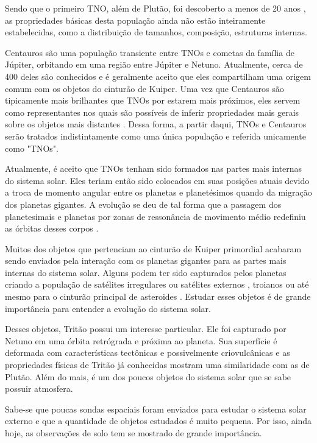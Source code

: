 \documentclass[12pt,a4paper]{monografia}
\begin{document}
Sendo que o primeiro TNO, além de Plutão, foi descoberto a menos de 20 anos \citep{Jewitt1993}, as propriedades básicas desta população ainda não estão inteiramente estabelecidas, como a distribuição de tamanhos, composição, estruturas internas.

Centauros são uma população transiente entre TNOs e cometas da família de Júpiter, orbitando em uma região entre Júpiter e Netuno. Atualmente, cerca de 400 deles são conhecidos e é geralmente aceito que eles compartilham uma origem comum com os objetos do cinturão de Kuiper. Uma vez que Centauros são tipicamente mais brilhantes que TNOs por estarem mais próximos, eles servem como representantes nos quais são possíveis de inferir propriedades mais gerais sobre os objetos mais distantes \citep{Fernandez2002}. Dessa forma, a partir daqui, TNOs e Centauros serão tratados indistintamente como uma única população e referida unicamente como "TNOs".

Atualmente, é aceito que TNOs tenham sido formados nas partes mais internas do sistema solar. Eles teriam então sido colocados em suas posições atuais devido a troca de momento angular entre os planetas e planetésimos quando da migração dos planetas gigantes. A evolução se deu de tal forma que a passagem dos planetesimais e planetas por zonas de ressonância de movimento médio redefiniu as órbitas desses corpos \citep{Tsiganis2005}.

Muitos dos objetos que pertenciam ao cinturão de Kuiper primordial acabaram sendo enviados pela interação com os planetas gigantes para as partes mais internas do sistema solar. Alguns podem ter sido capturados pelos planetas criando a população de satélites irregulares ou satélites externos \citep{Nesvorny2007}, troianos \citep{Morbidelli2005} ou até mesmo para o cinturão principal de asteroides \citep{McKinnon2012}. Estudar esses objetos é de grande importância para entender a evolução do sistema solar.

Desses objetos, Tritão possui um interesse particular. Ele foi capturado por Netuno \citep{McKinnon2007} em uma órbita retrógrada e próxima ao planeta. Sua superfície é deformada com características tectônicas e possivelmente criovulcânicas \citep{Nimmo2015} e as propriedades físicas de Tritão já conhecidas mostram uma similaridade com as de Plutão. Além do mais, é um dos poucos objetos do sistema solar que se sabe possuir atmosfera.

Sabe-se que poucas sondas espaciais foram enviados para estudar o sistema solar externo e que a quantidade de objetos estudados é muito pequena. Por isso, ainda hoje, as observações de solo tem se mostrado de grande importância.
\end{document}
